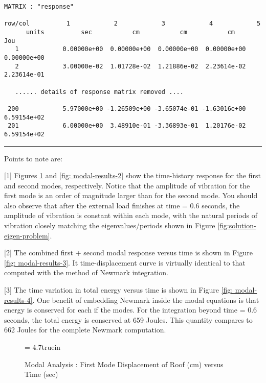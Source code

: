 \begin{footnotesize}
\begin{verbatim}
MATRIX : "response"

row/col          1            2            3            4            5          
      units          sec           cm           cm           cm          Jou   
   1            0.00000e+00  0.00000e+00  0.00000e+00  0.00000e+00  0.00000e+00
   2            3.00000e-02  1.01728e-02  1.21886e-02  2.23614e-02  2.23614e-01

   ...... details of response matrix removed ....

 200            5.97000e+00 -1.26509e+00 -3.65074e-01 -1.63016e+00  6.59154e+02
 201            6.00000e+00  3.48910e-01 -3.36893e-01  1.20176e-02  6.59154e+02
\end{verbatim}
\rule{6.25 in}{0.035 in}
\end{footnotesize}

\vspace{0.15 in}\noindent
Points to note are:

\vspace{0.10 in}
\begin{description}
\item{[1]}
Figures \ref{fig: modal-results-1} and \ref{fig: modal-results-2} 
show the time-history response for the first and second modes, respectively.
Notice that the amplitude of vibration for the first mode is an order of
magnitude larger than for the second mode. You should also observe that
after the external load finishes at time = 0.6 seconds,
the amplitude of vibration is constant within each mode,
with the natural periods of vibration closely matching the eigenvalues/periods
shown in Figure \ref{fig:solution-eigen-problem}.
\item{[2]}
The combined first + second modal response versus
time is shown in Figure \ref{fig: modal-results-3}.
It time-displacement curve is virtually identical to
that computed with the method of Newmark integration.
\item{[3]}
The time variation in total energy versus time
is shown in Figure \ref{fig: modal-results-4}.
One benefit of embedding Newmark inside the modal equations is that
energy is conserved for each if the modes. For the integration
beyond time = 0.6 seconds, the total energy is conserved at 659 Joules.
This quantity compares to 662 Joules for the complete Newmark computation.
\end{description}

\clearpage
\begin{figure}[ht]
\epsfxsize= 4.7truein
\centerline{}
\caption{Modal Analysis : First Mode Displacement of Roof (cm) versus Time (sec)}
\label{fig: modal-results-1}
\end{figure}

